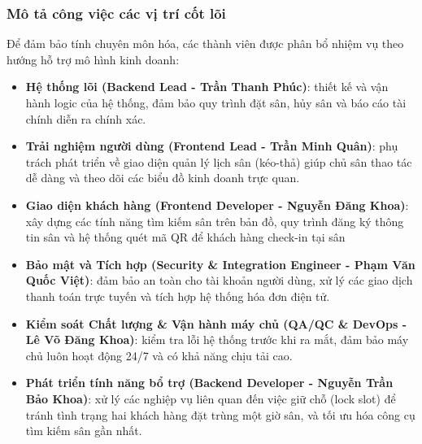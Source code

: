 \subsubsection{Mô tả công việc các vị trí cốt lõi}
Để đảm bảo tính chuyên môn hóa, các thành viên được phân bổ nhiệm vụ theo hướng hỗ trợ mô hình kinh doanh:
\begin{itemize}
    \item \textbf{Hệ thống lõi (Backend Lead - Trần Thanh Phúc)}: thiết kế và vận hành logic của hệ thống, đảm bảo quy trình đặt sân, hủy sân và báo cáo tài chính diễn ra chính xác.
    \item \textbf{Trải nghiệm người dùng (Frontend Lead - Trần Minh Quân)}: phụ trách phát triển về giao diện quản lý lịch sân (kéo-thả) giúp chủ sân thao tác dễ dàng và theo dõi các biểu đồ kinh doanh trực quan.
    \item \textbf{Giao diện khách hàng (Frontend Developer - Nguyễn Đăng Khoa)}: xây dựng các tính năng tìm kiếm sân trên bản đồ, quy trình đăng ký thông tin sân và hệ thống quét mã QR để khách hàng check-in tại sân
    \item \textbf{Bảo mật và Tích hợp (Security \& Integration Engineer - Phạm Văn Quốc Việt)}: đảm bảo an toàn cho tài khoản người dùng, xử lý các giao dịch thanh toán trực tuyến và tích hợp hệ thống hóa đơn điện tử.
    \item \textbf{Kiểm soát Chất lượng \& Vận hành máy chủ (QA/QC \& DevOps - Lê Võ Đăng Khoa)}: kiểm tra lỗi hệ thống trước khi ra mắt, đảm bảo máy chủ luôn hoạt động 24/7 và có khả năng chịu tải cao.
    \item \textbf{Phát triển tính năng bổ trợ (Backend Developer - Nguyễn Trần Bảo Khoa)}: xử lý các nghiệp vụ liên quan đến việc giữ chỗ (lock slot) để tránh tình trạng hai khách hàng đặt trùng một giờ sân, và tối ưu hóa công cụ tìm kiếm sân gần nhất.
\end{itemize}






